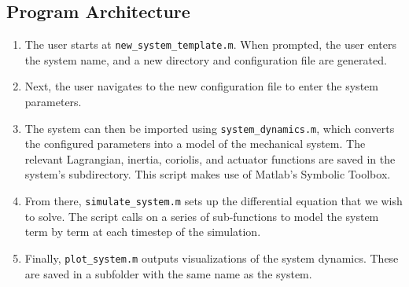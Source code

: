 \documentclass[main.tex]{subfiles}
\begin{document}
\subsection{Program Architecture}
\begin{enumerate}
    \item The user starts at \verb|new_system_template.m|. 
    When prompted, the user enters the system name, and a new directory and configuration file are generated.
    \item Next, the user navigates to the new configuration file to enter the system parameters.
    \item The system can then be imported using \verb|system_dynamics.m|, which converts the configured parameters into a model of the mechanical system. The relevant Lagrangian, inertia, coriolis, and actuator functions are saved in the system's subdirectory.
    This script makes use of Matlab's Symbolic Toolbox. 
    \item From there, \verb|simulate_system.m| sets up the differential equation that we wish to solve. The script calls on a series of sub-functions to model the system term by term at each timestep of the simulation. 
    \item Finally, \verb|plot_system.m| outputs visualizations of the system dynamics. These are saved in a subfolder with the same name as the system.
\end{enumerate}
\end{document}
